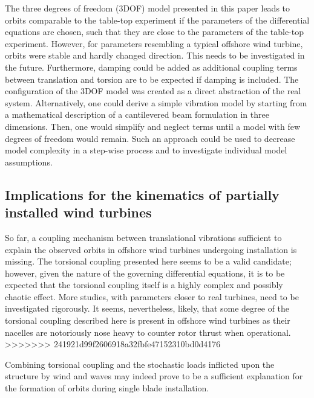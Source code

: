 \documentclass{article}
\begin{document}
The three degrees of freedom (3DOF) model presented in this paper leads to orbits comparable to the table-top experiment if the parameters of the differential equations are chosen, such that they are close to the parameters of the table-top experiment. However, for parameters resembling a typical offshore wind turbine, orbits were stable and  hardly changed direction. This needs to be investigated in the future. Furthermore, damping could be added as additional coupling terms between translation and torsion are to be expected if damping is included. The configuration of the 3DOF model was created as a direct abstraction of the real system. Alternatively, one could derive a simple vibration model by starting from a mathematical description of a cantilevered beam formulation in three dimensions. Then, one would simplify and neglect terms until a model with few degrees of freedom would remain. Such an approach could be used to decrease model complexity in a step-wise process and to investigate individual model assumptions.

\subsection{Implications for the kinematics of partially installed wind turbines}

So far, a coupling mechanism between translational vibrations sufficient to explain the observed orbits in offshore wind turbines undergoing installation is missing. The torsional coupling presented here seems to be a valid candidate; however, given the nature of the governing differential equations, it is to be expected that the torsional coupling itself is a highly complex and possibly chaotic effect. More studies, with parameters closer to real turbines, need to be investigated rigorously. It seems, nevertheless, likely, that some degree of the torsional coupling described here is present in offshore wind turbines as their nacelles are notoriously nose heavy to counter rotor thrust when operational. 
>>>>>>> 241921d99f2606918a32fbfe47152310bd0d4176

Combining torsional coupling and the stochastic loads inflicted upon the structure by wind and waves may indeed prove to be a sufficient explanation for the formation of orbits during single blade installation.

\clearpage


\end{document}
